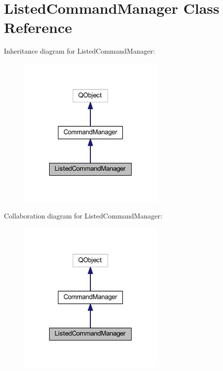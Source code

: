 \hypertarget{class_listed_command_manager}{\section{Listed\-Command\-Manager Class Reference}
\label{class_listed_command_manager}
}


Inheritance diagram for Listed\-Command\-Manager\-:\nopagebreak
\begin{figure}[H]
\begin{center}
\leavevmode
\includegraphics[width=204pt]{class_listed_command_manager__inherit__graph}
\end{center}
\end{figure}


Collaboration diagram for Listed\-Command\-Manager\-:\nopagebreak
\begin{figure}[H]
\begin{center}
\leavevmode
\includegraphics[width=204pt]{class_listed_command_manager__coll__graph}
\end{center}
\end{figure}
